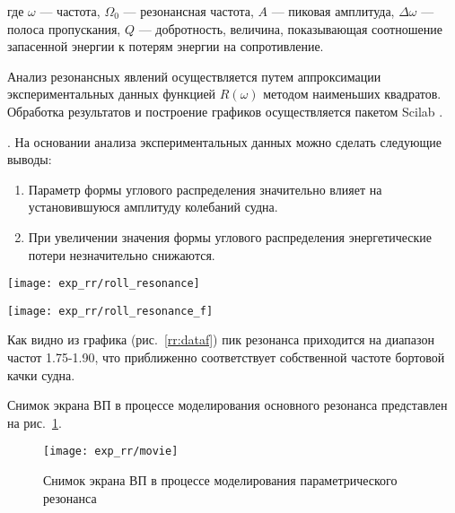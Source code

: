 где $\omega$ --- частота, $\Omega_0$ --- резонансная частота, $A$ --- пиковая амплитуда, $\Delta \omega$ --- полоса пропускания, $Q$ --- добротность, величина, показывающая соотношение запасенной энергии к потерям энергии на сопротивление.

Анализ резонансных явлений осуществляется путем аппроксимации экспериментальных данных функцией $R(\omega)$ методом наименьших квадратов. Обработка результатов и построение графиков осуществляется пакетом Scilab \citep{scilab}.


. На основании анализа экспериментальных данных можно сделать следующие выводы:
\begin{enumerate}
	\item	Параметр формы углового распределения значительно влияет на установившуюся амплитуду колебаний судна.
	\item 	При увеличении значения формы углового распределения энергетические потери незначительно снижаются.
\end{enumerate}

\begin{sidewaysfigure}
	\texttt{[image: exp\_rr/roll\_resonance]}
	\caption{Экспериментальные данные соотношения 10\%-ной обеспеченности модуля угла бортовой качки к энергии волнения}
	\label{rr:data}
\end{sidewaysfigure}

\begin{sidewaysfigure}
	\texttt{[image: exp\_rr/roll\_resonance\_f]}
	\caption{Аппроксимация данных соотношения 10\%-ной обеспеченности модуля угла бортовой качки к энергии волнения и параметры функции отклика}
	\label{rr:dataf}
\end{sidewaysfigure}


Как видно из графика (рис.~\ref{rr:dataf}) пик резонанса приходится на диапазон частот 1.75-1.90, что приближенно соответствует собственной частоте бортовой качки судна.

Снимок экрана ВП в процессе моделирования основного резонанса представлен на рис.~\ref{exp:rr_movie}.

\begin{figure}
	\begin{center}
	\texttt{[image: exp\_rr/movie]}
	\end{center}
	\caption{Снимок экрана ВП в процессе моделирования параметрического резонанса}
	\label{exp:rr_movie}
\end{figure}



